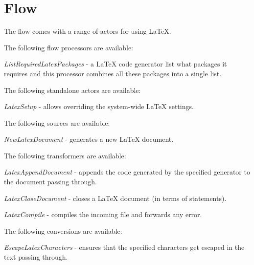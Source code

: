 \documentclass[a4paper]{book}
\begin{document}
\chapter{Flow}
The flow comes with a range of actors for using LaTeX.

\noindent The following flow processors are available:
\begin{tight_itemize}
	\item \textit{ListRequiredLatexPackages} - a LaTeX code generator
	list what packages it requires and this processor combines all these
	packages into a single list.
\end{tight_itemize}

\noindent The following standalone actors are available:
\begin{tight_itemize}
	\item \textit{LatexSetup} - allows overriding the system-wide
	LaTeX settings.
\end{tight_itemize}

\noindent The following sources are available:
\begin{tight_itemize}
	\item \textit{NewLatexDocument} - generates a new LaTeX document.
\end{tight_itemize}

\noindent The following transformers are available:
\begin{tight_itemize}
	\item \textit{LatexAppendDocument} - appends the code generated by the
	specified generator to the document passing through.
	\item \textit{LatexCloseDocument} - closes a LaTeX document (in terms of statements).
	\item \textit{LatexCompile} - compiles the incoming file and forwards any error.
\end{tight_itemize}

\noindent The following conversions are available:
\begin{tight_itemize}
	\item \textit{EscapeLatexCharacters} - ensures that the specified
	characters get escaped in the text passing through.
\end{tight_itemize}

\end{document}
